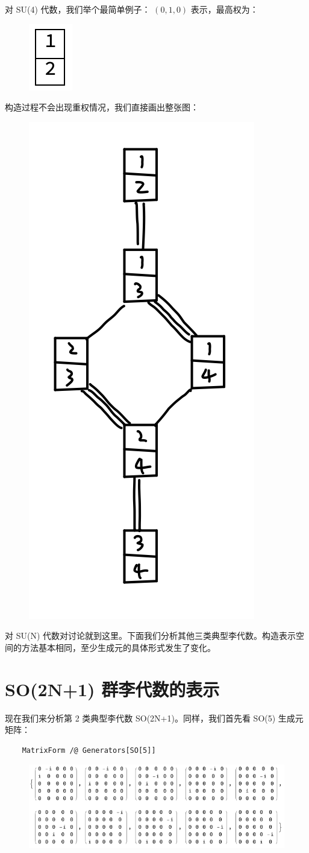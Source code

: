 \documentclass[UTF8]{ctexart}
\begin{document}
\noindent 对 SU(4) 代数，我们举个最简单例子： $(0,1,0)$ 表示，最高权为：

\begin{figure}[H]
\begin{centering}
\includegraphics[width=0.06\linewidth]{include/Y11}
\par\end{centering}
\end{figure}

\noindent 构造过程不会出现重权情况，我们直接画出整张图：

\begin{figure}[H]
\begin{centering}
\includegraphics[width=0.3\linewidth]{include/T5}
\par\end{centering}
\end{figure}

\noindent 对 SU(N) 代数对讨论就到这里。下面我们分析其他三类典型李代数。构造表示空间的方法基本相同，至少生成元的具体形式发生了变化。

\section*{SO(2N+1) 群李代数的表示}
\noindent 现在我们来分析第 2 类典型李代数 SO(2N+1)。同样，我们首先看 SO(5) 生成元矩阵：
\begin{verbatim}
	MatrixForm /@ Generators[SO[5]]
\end{verbatim}

\begin{figure}[H]
\begin{centering}
\includegraphics[width=0.8\linewidth]{include/O10}
\par\end{centering}
\end{figure}
\end{document}
